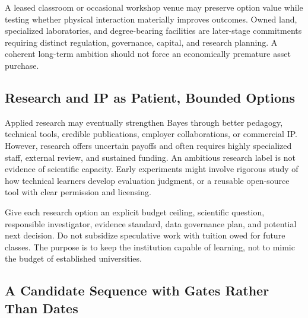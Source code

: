 A leased classroom or occasional workshop venue may preserve option value while testing whether physical interaction materially improves outcomes. Owned land, specialized laboratories, and degree-bearing facilities are later-stage commitments requiring distinct regulation, governance, capital, and research planning. A coherent long-term ambition should not force an economically premature asset purchase.

\subsection{Research and IP as Patient, Bounded Options}
\label{sec:research_and_ip_bounded_options}

Applied research may eventually strengthen Bayes through better pedagogy, technical tools, credible publications, employer collaborations, or commercial IP. However, research offers uncertain payoffs and often requires highly specialized staff, external review, and sustained funding. An ambitious research label is not evidence of scientific capacity. Early experiments might involve rigorous study of how technical learners develop evaluation judgment, or a reusable open-source tool with clear permission and licensing.

Give each research option an explicit budget ceiling, scientific question, responsible investigator, evidence standard, data governance plan, and potential next decision. Do not subsidize speculative work with tuition owed for future classes. The purpose is to keep the institution capable of learning, not to mimic the budget of established universities.

\subsection{A Candidate Sequence with Gates Rather Than Dates}
\label{sec:candidate_sequence_gates_not_dates}

